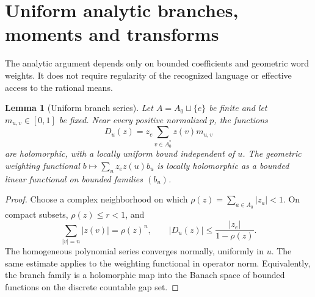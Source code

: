 \documentclass[11pt]{article}
\newtheorem{lemma}[theorem]{Lemma}
\theoremstyle{definition}
\theoremstyle{remark}
\begin{document}
\section{Uniform analytic branches, moments and transforms}\label{sec:analytic}
The analytic argument depends only on bounded coefficients and geometric word weights. It does not require regularity of the recognized language or effective access to the rational means.

\begin{lemma}[Uniform branch series]\label{lem:analytic}
Let $A=A_0\sqcup\{e\}$ be finite and let $m_{u,v}\in[0,1]$ be fixed. Near every positive normalized $p$, the functions
\[
 D_u(z)=z_e\sum_{v\in A_0^*}z(v)m_{u,v}
\]
are holomorphic, with a locally uniform bound independent of $u$. The geometric weighting functional
$b\mapsto\sum_u z_e z(u)b_u$ is locally holomorphic as a bounded linear functional on bounded families $(b_u)$.
\end{lemma}
\begin{proof}
Choose a complex neighborhood on which $\rho(z)=\sum_{a\in A_0}|z_a|<1$. On compact subsets, $\rho(z)\leq r<1$, and
\[
 \sum_{|v|=n}|z(v)|=\rho(z)^n,\qquad
 |D_u(z)|\leq\frac{|z_e|}{1-\rho(z)}.
\]
The homogeneous polynomial series converges normally, uniformly in $u$. The same estimate applies to the weighting functional in operator norm. Equivalently, the branch family is a holomorphic map into the Banach space of bounded functions on the discrete countable gap set.
\end{proof}
\end{document}
